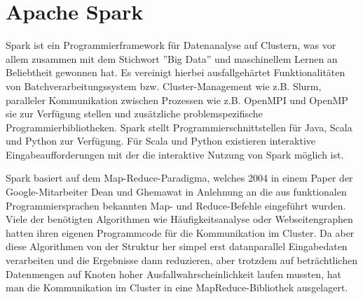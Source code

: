 
\chapter{Apache Spark}
\label{sct:spark}

Spark ist ein Programmierframework für Datenanalyse auf Clustern, was vor allem zusammen mit dem Stichwort ''Big Data'' und maschinellem Lernen an Beliebtheit gewonnen hat.
Es vereinigt hierbei ausfallgehärtet Funktionalitäten von Batchverarbeitungssystem bzw. Cluster-Management wie z.B. Slurm, paralleler Kommunikation zwischen Prozessen wie z.B. OpenMPI und OpenMP sie zur Verfügung stellen und zusätzliche problemspezifische Programmierbibliotheken.
Spark stellt Programmierschnittstellen für Java, Scala und Python zur Verfügung. Für Scala und Python existieren interaktive Eingabeaufforderungen mit der die interaktive Nutzung von Spark möglich ist.


Spark basiert auf dem Map-Reduce-Paradigma, welches 2004 in einem Paper der Google-Mitarbeiter Dean und Ghemawat\cite{mapreduce2004,mapreduce2008} in Anlehnung an die aus funktionalen Programmiersprachen bekannten Map- und Reduce-Befehle eingeführt wurden. Viele der benötigten Algorithmen wie Häufigkeitsanalyse oder Webseitengraphen hatten ihren eigenen Programmcode für die Kommunikation im Cluster. Da aber diese Algorithmen von der Struktur her simpel erst datanparallel Eingabedaten verarbeiten und die Ergebnisse dann reduzieren, aber trotzdem auf beträchtlichen Datenmengen auf Knoten hoher Ausfallwahrscheinlichkeit laufen mussten, hat man die Kommunikation im Cluster in eine MapReduce-Bibliothek ausgelagert.

